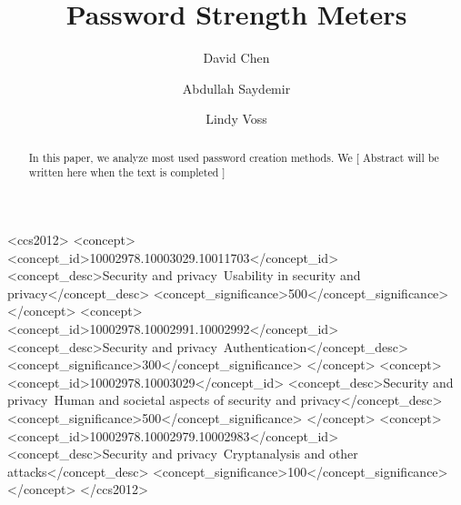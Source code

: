 \documentclass[acmsmall,nonacm]{acmart}
\begin{document}
\title{Password Strength Meters}

\author{David Chen}

\author{Abdullah Saydemir}

\author{Lindy Voss}


\renewcommand{\shortauthors}{Chen, Voss \& Saydemir}

\begin{abstract}
    In this paper, we analyze most used password creation methods. We 
    \textcolor{beaver}{[ Abstract will be written here when the text is completed ]}
\end{abstract}

\begin{CCSXML}
<ccs2012>
   <concept>
       <concept_id>10002978.10003029.10011703</concept_id>
       <concept_desc>Security and privacy~Usability in security and privacy</concept_desc>
       <concept_significance>500</concept_significance>
       </concept>
   <concept>
       <concept_id>10002978.10002991.10002992</concept_id>
       <concept_desc>Security and privacy~Authentication</concept_desc>
       <concept_significance>300</concept_significance>
       </concept>
   <concept>
       <concept_id>10002978.10003029</concept_id>
       <concept_desc>Security and privacy~Human and societal aspects of security and privacy</concept_desc>
       <concept_significance>500</concept_significance>
       </concept>
   <concept>
       <concept_id>10002978.10002979.10002983</concept_id>
       <concept_desc>Security and privacy~Cryptanalysis and other attacks</concept_desc>
       <concept_significance>100</concept_significance>
       </concept>
 </ccs2012>
\end{CCSXML}
\end{document}
